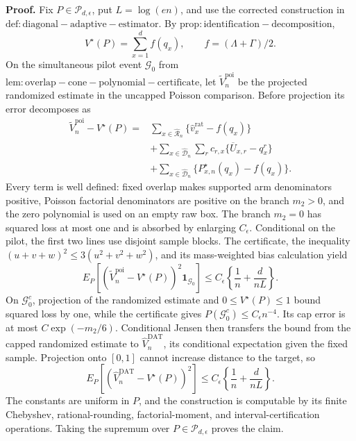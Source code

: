 \textbf{Proof.}
Fix \(P\in\mathcal P_{d,\epsilon}\), put \(L=\log(en)\), and use the corrected construction in \(\mathrm{def:diagonal-adaptive-estimator}\).  By \(\mathrm{prop:identification-decomposition}\),
\[
 V^\star(P)=\sum_{x=1}^df(q_x),
 \qquad f=(\Lambda+\Gamma)/2.
\]
On the simultaneous pilot event \(\mathcal G_0\) from \(\mathrm{lem:overlap-cone-polynomial-certificate}\), let \(\widetilde V_n^{\mathrm{poi}}\) be the projected randomized estimate in the uncapped Poisson comparison.  Before projection its error decomposes as
\[
 \begin{aligned}
 \widetilde V_n^{\mathrm{poi}}-V^\star(P)
 ={}&\sum_{x\in\widehat{\mathcal R}_n}
      \{\widehat v_x^{\mathrm{rat}}-f(q_x)\}\\
 &+\sum_{x\in\widehat{\mathcal D}_n}
   \sum_r c_{r,x}\{\overline U_{x,r}-q_x^r\}\\
 &+\sum_{x\in\widehat{\mathcal D}_n}
   \{P^\star_{x,n}(q_x)-f(q_x)\}.
 \end{aligned}
\]
Every term is well defined: fixed overlap makes supported arm denominators positive, Poisson factorial denominators are positive on the branch \(m_2>0\), and the zero polynomial is used on an empty raw box.  The branch \(m_2=0\) has squared loss at most one and is absorbed by enlarging \(C_\epsilon\).  Conditional on the pilot, the first two lines use disjoint sample blocks.  The certificate, the inequality \((u+v+w)^2\le3(u^2+v^2+w^2)\), and its mass-weighted bias calculation yield
\[
 E_P\!\left[
  (\widetilde V_n^{\mathrm{poi}}-V^\star(P))^2
  \mathbf1_{\mathcal G_0}
 \right]
 \le C_\epsilon\left\{\frac1n+\frac d{nL}\right\}.
\]
On \(\mathcal G_0^c\), projection of the randomized estimate and \(0\le V^\star(P)\le1\) bound squared loss by one, while the certificate gives \(P(\mathcal G_0^c)\le C_\epsilon n^{-4}\).  Its cap error is at most \(C\exp(-m_2/6)\).  Conditional Jensen then transfers the bound from the capped randomized estimate to \(\widehat V_n^{\mathrm{DAT}}\), its conditional expectation given the fixed sample.  Projection onto \([0,1]\) cannot increase distance to the target, so
\[
 E_P[(\widehat V_n^{\mathrm{DAT}}-V^\star(P))^2]
 \le C_\epsilon\left\{\frac1n+\frac d{nL}\right\}.
\]
The constants are uniform in \(P\), and the construction is computable by its finite Chebyshev, rational-rounding, factorial-moment, and interval-certification operations.  Taking the supremum over \(P\in\mathcal P_{d,\epsilon}\) proves the claim.